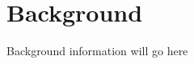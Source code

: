 \documentclass[main.tex]{subfiles}
\begin{document}
\section*{Background}
Background information will go here
\end{document}
